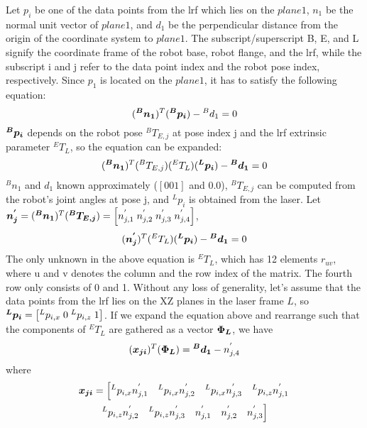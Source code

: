 Let $p_i$ be one of the data points from the \ac{lrf} which lies on the $plane 1$, $n_1$ be the normal unit vector of $plane 1$, and $d_1$ be the perpendicular distance from the origin of the coordinate system to $plane 1$. The subscript/superscript B, E, and L signify the coordinate frame of the robot base, robot flange, and the \ac{lrf}, while the subscript i and j refer to the data point index and the robot pose index, respectively. 
Since $p_1$ is located on the $plane 1$, it has to satisfy the following equation:
  \begin{equation}
  (\vb*{{^B}n_1}) ^T (\vb*{{^B}p_i}) - {^B}d_1 = 0
   \end{equation}
$\vb*{{^B}p_i}$ depends on the robot pose ${^B}T_{E,j}$ at pose index j and the \ac{lrf} extrinsic parameter ${^E}T_L$, so the equation can be expanded:
  \begin{equation}
  (\vb*{{^B}n_1}) ^T ({^B}T_{E,j}) ({^E}T_L) (\vb*{{^L}p_i}) - \vb*{{^B}d_1} = 0
  \end{equation}
${^B}n_1$ and $d_1$ known approximately ($[0 0 1]$ and $0.0$), ${^B}T_{E,j}$ can be computed from the robot's joint angles at pose j, and ${^L}p_i$ is obtained from the laser. Let $\vb*{n^{'}_j} = (\vb*{{^B}n_1}) ^T (\vb*{{^B}T_{E,j}}) = 
\left[n^{'}_{j,1} \; n^{'}_{j,2} \; n^{'}_{j,3}  \; n^{'}_{j,4} \right]$,  
  \begin{equation}
  (\vb*{n^{'}_j}) ^T ({^E}T_L) (\vb*{{^L}p_i}) - \vb*{{^B}d_1} = 0
  \end{equation}
The only unknown in the above equation is ${^E}T_L$, which has 12 elements $r_{uv}$, where u and v denotes the column and the row index of the matrix. The fourth row only consists of 0 and 1. Without any loss of generality, let's assume that the data points from the \ac{lrf} lies on the XZ planes in the laser frame $L$, so $\vb*{{^L}p_i} = \left[{^L}p_{i,x} \; 0 \; {^L}p_{i,z}\; 1\right]$. If we expand the equation above and rearrange such that the components of ${^E}T_L$ are gathered as a vector $\vb*{\Phi_L}$, we have
\begin{equation}
  (\vb*{x_{ji}})  ^T (\vb*{\Phi_L}) = \vb*{{^B}d_1} -  n^{'}_{j,4}
\end{equation}
where 
\begin{multline}
  \vb*{x_{ji}} = \left[{^L}p_{i,x}n^{'}_{j,1} \quad {^L}p_{i,x}n^{'}_{j,2}\quad {^L}p_{i,x}n^{'}_{j,3}\quad  {^L}p_{i,z}n^{'}_{j,1}\right. \\ 
\left. {^L}p_{i,z}n^{'}_{j,2}\quad {^L}p_{i,z}n^{'}_{j,3} \quad n^{'}_{j,1} \quad n^{'}_{j,2} \quad n^{'}_{j,3} \right]
\end{multline}
